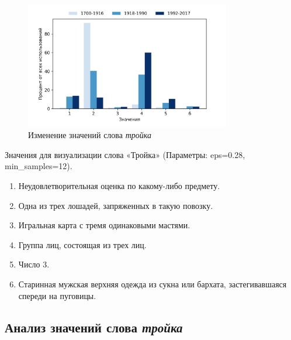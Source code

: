 \documentclass[LI,VKR]{HSEUniversity}
\begin{document}
%

\begin{figure}[H]
	\centering
	\includegraphics[width=0.8\textwidth]{img/visualizations/trojka_minimal}
	\caption{Изменение значений слова \textit{тройка}}
	\label{fig:Тройка}
\end{figure}

Значения для визуализации слова «Тройка» (Параметры: eps=0.28, min\_samples=12).

\begin{enumerate}
    \item Неудовлетворительная оценка по какому-либо предмету.
    \item Одна из трех лошадей, запряженных в такую повозку.
    \item Игральная карта с тремя одинаковыми мастями.
    \item Группа лиц, состоящая из трех лиц.
    \item Число 3.
    \item Старинная мужская верхняя одежда из сукна или бархата, застегивавшаяся спереди на пуговицы.
\end{enumerate}

\subsection*{Анализ значений слова \textit{тройка}}
\end{document}
